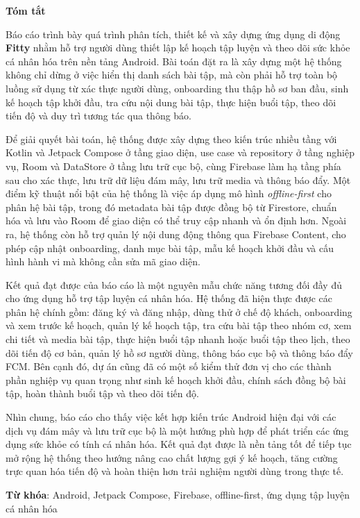 \begin{center}
\textbf{\large{Tóm tắt}}
\end{center}


\begin{small}

Báo cáo trình bày quá trình phân tích, thiết kế và xây dựng ứng dụng di động \textbf{Fitty} nhằm hỗ trợ người dùng thiết lập kế hoạch tập luyện và theo dõi sức khỏe cá nhân hóa trên nền tảng Android. Bài toán đặt ra là xây dựng một hệ thống không chỉ dừng ở việc hiển thị danh sách bài tập, mà còn phải hỗ trợ toàn bộ luồng sử dụng từ xác thực người dùng, onboarding thu thập hồ sơ ban đầu, sinh kế hoạch tập khởi đầu, tra cứu nội dung bài tập, thực hiện buổi tập, theo dõi tiến độ và duy trì tương tác qua thông báo.

Để giải quyết bài toán, hệ thống được xây dựng theo kiến trúc nhiều tầng với Kotlin và Jetpack Compose ở tầng giao diện, use case và repository ở tầng nghiệp vụ, Room và DataStore ở tầng lưu trữ cục bộ, cùng Firebase làm hạ tầng phía sau cho xác thực, lưu trữ dữ liệu đám mây, lưu trữ media và thông báo đẩy. Một điểm kỹ thuật nổi bật của hệ thống là việc áp dụng mô hình \textit{offline-first} cho phân hệ bài tập, trong đó metadata bài tập được đồng bộ từ Firestore, chuẩn hóa và lưu vào Room để giao diện có thể truy cập nhanh và ổn định hơn. Ngoài ra, hệ thống còn hỗ trợ quản lý nội dung động thông qua Firebase Content, cho phép cập nhật onboarding, danh mục bài tập, mẫu kế hoạch khởi đầu và cấu hình hành vi mà không cần sửa mã giao diện.

Kết quả đạt được của báo cáo là một nguyên mẫu chức năng tương đối đầy đủ cho ứng dụng hỗ trợ tập luyện cá nhân hóa. Hệ thống đã hiện thực được các phân hệ chính gồm: đăng ký và đăng nhập, dùng thử ở chế độ khách, onboarding và xem trước kế hoạch, quản lý kế hoạch tập, tra cứu bài tập theo nhóm cơ, xem chi tiết và media bài tập, thực hiện buổi tập nhanh hoặc buổi tập theo lịch, theo dõi tiến độ cơ bản, quản lý hồ sơ người dùng, thông báo cục bộ và thông báo đẩy FCM. Bên cạnh đó, dự án cũng đã có một số kiểm thử đơn vị cho các thành phần nghiệp vụ quan trọng như sinh kế hoạch khởi đầu, chính sách đồng bộ bài tập, hoàn thành buổi tập và theo dõi tiến độ.

Nhìn chung, báo cáo cho thấy việc kết hợp kiến trúc Android hiện đại với các dịch vụ đám mây và lưu trữ cục bộ là một hướng phù hợp để phát triển các ứng dụng sức khỏe có tính cá nhân hóa. Kết quả đạt được là nền tảng tốt để tiếp tục mở rộng hệ thống theo hướng nâng cao chất lượng gợi ý kế hoạch, tăng cường trực quan hóa tiến độ và hoàn thiện hơn trải nghiệm người dùng trong thực tế.

\vspace*{1cm}
\textbf{Từ khóa}: Android, Jetpack Compose, Firebase, offline-first, ứng dụng tập luyện cá nhân hóa

\end{small}
